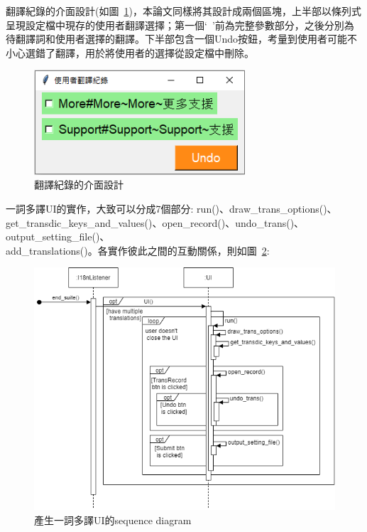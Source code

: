 翻譯紀錄的介面設計(如圖~\ref{翻譯紀錄的介面設計})，本論文同樣將其設計成兩個區塊，上半部以條列式呈現設定檔中現存的使用者翻譯選擇；第一個‘~’前為完整參數部分，之後分別為待翻譯詞和使用者選擇的翻譯。下半部包含一個Undo按鈕，考量到使用者可能不小心選錯了翻譯，用於將使用者的選擇從設定檔中刪除。
\begin{figure}[H]
    \centering
    \includegraphics[width= 0.7\textwidth]{../論文截圖/3-4-2 翻譯紀錄介面設計.png}
    \caption{翻譯紀錄的介面設計}
    \label{翻譯紀錄的介面設計}
\end{figure}

一詞多譯UI的實作，大致可以分成7個部分: run()、draw\_trans\_options()、get\_transdic\_keys\_and\_values()、open\_record()、undo\_trans()、output\_setting\_file()、\\add\_translations()。各實作彼此之間的互動關係，則如圖~\ref{產生一詞多譯UI的sequence diagram}:
\begin{figure}[H]
    \centering
    \includegraphics[width= \textwidth]{../UML/i18n sequence diagram-一詞多譯UI.png}
    \caption{產生一詞多譯UI的sequence diagram}
    \label{產生一詞多譯UI的sequence diagram}
\end{figure}


